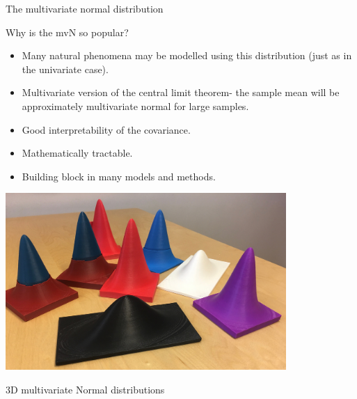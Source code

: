 \documentclass[ignorenonframetext,]{beamer}
\providecommand{\tightlist}{%
  \setlength{\itemsep}{0pt}\setlength{\parskip}{0pt}}
\begin{document}
\begin{frame}

\end{frame}

\begin{frame}{The multivariate normal distribution}

\vspace{2mm}

Why is the mvN so popular?

\begin{itemize}
\tightlist
\item
  Many natural phenomena may be modelled using this distribution (just
  as in the univariate case).
\item
  Multivariate version of the central limit theorem- the sample mean
  will be approximately multivariate normal for large samples.
\item
  Good interpretability of the covariance.
\item
  Mathematically tractable.
\item
  Building block in many models and methods.
\end{itemize}

\end{frame}

\begin{frame}

\centering
\includegraphics[width=0.80000\textwidth]{mvN.jpeg}

3D multivariate Normal distributions

\end{frame}
\end{document}
